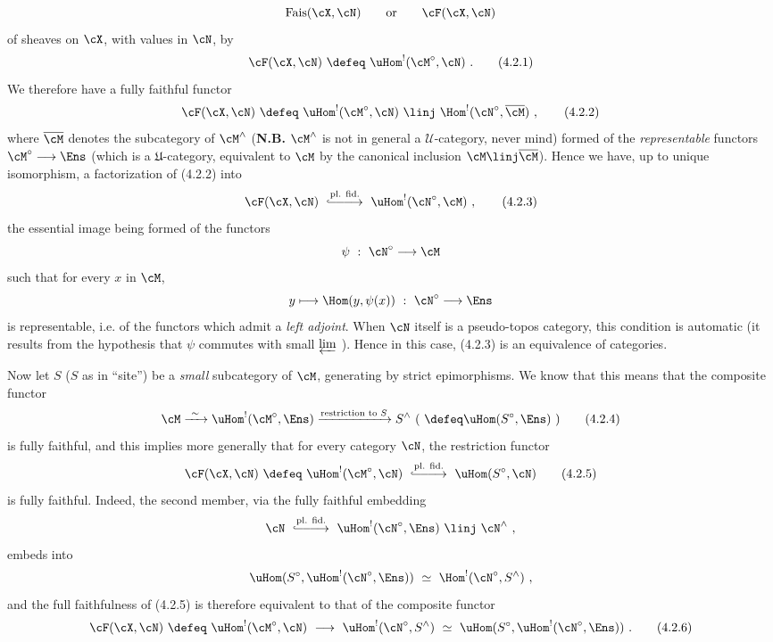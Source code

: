 \[
\mathrm{Fais}(\cX,\cN) \qquad \text{or} \qquad \cF(\cX,\cN)
\]
of sheaves on $\cX$, with values in $\cN$, by
\[
\cF(\cX,\cN) \ \defeq\ \uHom^{!}(\cM^{\circ},\cN) \ .
\tag*{(4.2.1)}
\]
We therefore have a fully faithful functor
\[
\cF(\cX,\cN) \ \defeq\ \uHom^{!}(\cM^{\circ},\cN) \ \linj\ \Hom^{!}(\cN^{\circ},\overline{\cM}) \ ,
\tag*{(4.2.2)}
\]
where $\overline{\cM}$ denotes the subcategory of $\cM^{\wedge}$ (\textbf{N.B.} $\cM^{\wedge}$ is not in general a $\mathcal{U}$-category, never mind) formed of the \textit{representable} functors $\cM^{\circ}\longrightarrow\Ens$ (which is a $\mathfrak{U}$-category, equivalent to $\cM$ by the canonical inclusion $\cM \linj \overline{\cM}$). Hence we have, up to unique isomorphism, a factorization of (4.2.2) into
\[
\cF(\cX,\cN) \ \overset{\text{pl. fid.}}{\lhook\joinrel\relbar\joinrel\relbar\joinrel\longrightarrow}\ \uHom^{!}(\cN^{\circ},\cM) \ ,
\tag*{(4.2.3)}
\]
the essential image being formed of the functors
\[
\psi \ :\ \cN^{\circ} \longrightarrow \cM
\]
such that for every $x$ in $\cM$,
\[
y \longmapsto \Hom(y,\psi(x)) \ :\ \cN^{\circ} \longrightarrow \Ens
\]
is representable, i.e. of the functors which
admit a \textit{left adjoint}. When $\cN$ itself is a pseudo-topos category, this condition is automatic (it results from the hypothesis that $\psi$ commutes with small $\varprojlim$ ). Hence in this case, (4.2.3) is an equivalence of categories.

Now let $S$ ($S$ as in ``site'') be a \textit{small} subcategory of $\cM$, generating by strict epimorphisms. We know that this means that the composite functor
\[
\cM \xrightarrow{\ \sim\ } \uHom^{!}(\cM^{\circ},\Ens) \xrightarrow{\text{restriction to } S} S^{\wedge} \ (\ \defeq \uHom(S^{\circ},\Ens)\ )
\tag*{(4.2.4)}
\]
is fully faithful, and this implies more generally that for every category $\cN$, the restriction functor
\[
\cF(\cX,\cN) \ \defeq\ \uHom^{!}(\cM^{\circ},\cN) \ \overset{\text{pl. fid.}}{\lhook\joinrel\relbar\joinrel\relbar\joinrel\longrightarrow}\ \uHom(S^{\circ},\cN)
\tag*{(4.2.5)}
\]
is fully faithful. Indeed, the second member, via the fully faithful embedding
\[
\cN \ \overset{\text{pl. fid.}}{\lhook\joinrel\relbar\joinrel\relbar\joinrel\longrightarrow}\ \uHom^{!}(\cN^{\circ},\Ens) \ \linj\ \cN^{\wedge} \ ,
\]
embeds into
\[
\uHom(S^{\circ},\uHom^{!}(\cN^{\circ},\Ens)) \ \simeq\ \Hom^{!}(\cN^{\circ},S^{\wedge}) \ ,
\]
and the full faithfulness of (4.2.5) is therefore equivalent to that of the composite functor
\[
\cF(\cX,\cN) \ \defeq\ \uHom^{!}(\cM^{\circ},\cN) \ \longrightarrow\ \uHom^{!}(\cN^{\circ},S^{\wedge}) \ \simeq\ \uHom(S^{\circ},\uHom^{!}(\cN^{\circ},\Ens)) \ .
\tag*{(4.2.6)}
\]

